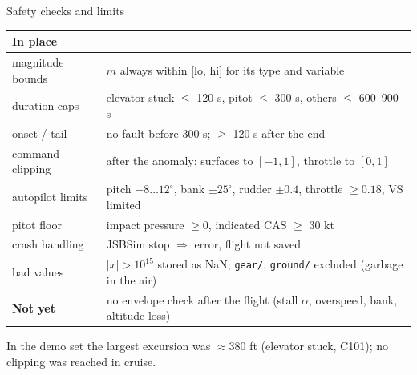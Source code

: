 \documentclass[aspectratio=169,11pt]{beamer}
\newcommand{\aside}[1]{{\color{muted}\small #1}}
\begin{document}
\begin{frame}{Safety checks and limits}
  \small
  \begin{tabularx}{\textwidth}{@{}l L@{}}
    \toprule
    \textbf{In place} & \\
    \midrule
    magnitude bounds & $m$ always within [lo, hi] for its type and variable \\
    duration caps & elevator stuck $\le$ 120 s, pitot $\le$ 300 s, others $\le$ 600--900 s \\
    onset / tail & no fault before 300 s; $\ge$ 120 s after the end \\
    command clipping & after the anomaly: surfaces to $[-1, 1]$, throttle to $[0, 1]$ \\
    autopilot limits & pitch $-8\dots12^\circ$, bank $\pm25^\circ$, rudder $\pm0.4$, throttle $\ge 0.18$, VS limited \\
    pitot floor & impact pressure $\ge 0$, indicated CAS $\ge$ 30 kt \\
    crash handling & JSBSim stop $\Rightarrow$ error, flight not saved \\
    bad values & $|x| > 10^{15}$ stored as NaN; \texttt{gear/}, \texttt{ground/} excluded (garbage in the air) \\
    \midrule
    \textbf{Not yet} & no envelope check after the flight (stall $\alpha$, overspeed, bank, altitude loss) \\
    \bottomrule
  \end{tabularx}
  \vspace{0.6em}

  \aside{In the demo set the largest excursion was $\approx$380 ft (elevator stuck, C101); no clipping was reached in cruise.}
\end{frame}
\end{document}
